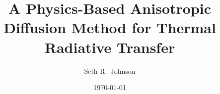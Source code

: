 \author{Seth R.~Johnson}
\title{A Physics-Based Anisotropic Diffusion Method for Thermal Radiative
Transfer}
\date{\today}

\usepackage{color}

\newcommand{\chapter}[1]{%
\par\vspace{2ex}%
\noindent%
\hspace{\stretch{1}}%
\colorbox{intertextbg}{\parbox{0.75\columnwidth}{Chapter from Seth's
dissertation: \emph{#1}}}%
\hspace{\stretch{1}}%
\vspace{2ex}\par%
}

\graphicspath{{/Users/seth/_research/figures/}}
\makeatletter
{}
\makeatother

\newcommand{\prelistpar}{}
